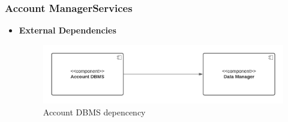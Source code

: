 \subsubsection*{Account ManagerServices}
\begin{itemize}
    \item \textbf{External Dependencies}
    \begin{figure}[h!]
        \centering
        \includegraphics[width=.8\textwidth]{Images/TestDiagram/Account/ExternalDependenciesDBMS.png}
        \caption{\label{fig:AccountExternalDepDBMS}{Account DBMS depencency}}
    \end{figure}
    \FloatBarrier  
    

\end{itemize}
